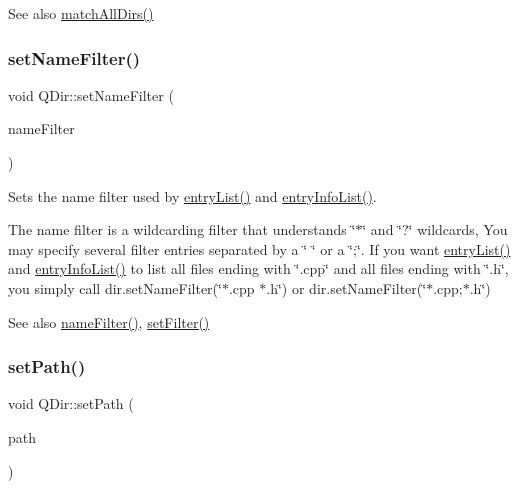 \begin{DoxySeeAlso}{See also}
\mbox{\hyperlink{class_q_dir_a54bd9584a7c74412da7945ef57d895e0}{match\+All\+Dirs()}} 
\end{DoxySeeAlso}
\mbox{\label{class_q_dir_a26b95e183a9ba9410219a3ce4d8c3416}} 
\subsubsection{\texorpdfstring{setNameFilter()}{setNameFilter()}}
{\footnotesize\ttfamily void Q\+Dir\+::set\+Name\+Filter (\begin{DoxyParamCaption}\item[{const \mbox{\hyperlink{class_q_string}{Q\+String}} \&}]{name\+Filter }\end{DoxyParamCaption})\hspace{0.3cm}{\ttfamily [virtual]}}

Sets the name filter used by \mbox{\hyperlink{class_q_dir_ab5e2b4ce772dc4b8941425cf780df9ab}{entry\+List()}} and \mbox{\hyperlink{class_q_dir_ada9ea9da108cbebd0ac88231f39fced0}{entry\+Info\+List()}}.

The name filter is a wildcarding filter that understands \char`\"{}$\ast$\char`\"{} and \char`\"{}?\char`\"{} wildcards, You may specify several filter entries separated by a \char`\"{} \char`\"{} or a \char`\"{};\char`\"{}. If you want \mbox{\hyperlink{class_q_dir_ab5e2b4ce772dc4b8941425cf780df9ab}{entry\+List()}} and \mbox{\hyperlink{class_q_dir_ada9ea9da108cbebd0ac88231f39fced0}{entry\+Info\+List()}} to list all files ending with \char`\"{}.\+cpp\char`\"{} and all files ending with \char`\"{}.\+h\char`\"{}, you simply call dir.\+set\+Name\+Filter(\char`\"{}$\ast$.\+cpp $\ast$.\+h\char`\"{}) or dir.\+set\+Name\+Filter(\char`\"{}$\ast$.\+cpp;$\ast$.\+h\char`\"{})

\begin{DoxySeeAlso}{See also}
\mbox{\hyperlink{class_q_dir_a6d71d046861c1728359a6119a1250a74}{name\+Filter()}}, \mbox{\hyperlink{class_q_dir_a68d9e723870b5f8226353dc6047a35ee}{set\+Filter()}} 
\end{DoxySeeAlso}
\mbox{\label{class_q_dir_ac947989c99aecbfebd509088b8834715}} 
\subsubsection{\texorpdfstring{setPath()}{setPath()}}
{\footnotesize\ttfamily void Q\+Dir\+::set\+Path (\begin{DoxyParamCaption}\item[{const \mbox{\hyperlink{class_q_string}{Q\+String}} \&}]{path }\end{DoxyParamCaption})\hspace{0.3cm}{\ttfamily [virtual]}}

